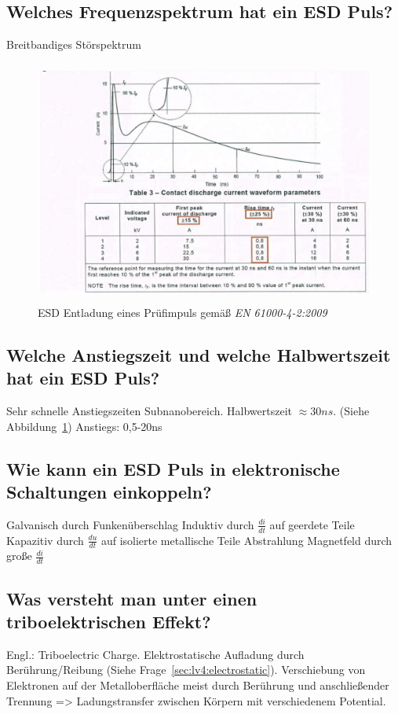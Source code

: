 \subsection{Welches Frequenzspektrum hat ein ESD Puls?}
Breitbandiges Störspektrum

\begin{figure}[ht]
  \centering
  \includegraphics[height=8cm]{src/assets/pictures/lv4_esd_impuls.png}
  \caption{ESD Entladung eines Prüfimpuls gemäß \textit{EN 61000-4-2:2009}}\label{fig:lv4:esd_impuls}
\end{figure}

\subsection{Welche Anstiegszeit und welche Halbwertszeit hat ein ESD Puls?}
Sehr schnelle Anstiegszeiten Subnanobereich. Halbwertszeit \(\approx 30ns\). (Siehe Abbildung~\ref{fig:lv4:esd_impuls})
Anstiegs: 0,5-20ns

\subsection{Wie kann ein ESD Puls in elektronische Schaltungen einkoppeln?}
\begin{outline}
  \1 Galvanisch durch Funkenüberschlag
  \1 Induktiv durch \(\frac{di}{dt}\) auf geerdete Teile
  \1 Kapazitiv durch \(\frac{du}{dt}\) auf isolierte metallische Teile
  \1 Abstrahlung Magnetfeld durch große \(\frac{di}{dt}\)
\end{outline}

\subsection{Was versteht man unter einen triboelektrischen Effekt?}
Engl.: Triboelectric Charge. Elektrostatische Aufladung durch Berührung/Reibung (Siehe Frage~\ref{sec:lv4:electrostatic}). Verschiebung von Elektronen auf der Metalloberfläche meist durch Berührung und anschließender Trennung => Ladungstransfer zwischen Körpern mit verschiedenem Potential.

